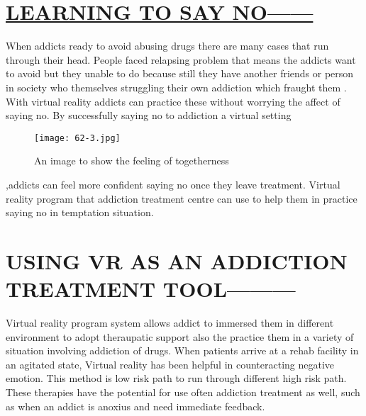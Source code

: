 \documentclass[12pts]{article}
\begin{document}
\section*{\underline{LEARNING TO SAY NO------}}
\begin{large}
\begin{flushleft}
When addicts ready to avoid abusing drugs there are many cases that run 
through their head. People faced relapsing problem that means the addicts 
want to avoid but they unable to do because still they have another friends or 
person in society who themselves struggling their own addiction which fraught 
them . With virtual reality addicts can practice these without worrying the 
affect of saying no. By successfully saying no to addiction a virtual setting 

\begin{figure}[h]
\centering
\texttt{[image: 62-3.jpg]}
\caption{An image to show the feeling of togetherness}
\end{figure}

,addicts can feel more confident saying no once they leave treatment. Virtual 
reality program that addiction treatment centre can use to help them in 
practice saying no in temptation situation.
\end{flushleft}
\end{large}


\section*{USING VR AS AN ADDICTION TREATMENT 
TOOL---------}
\begin{large}
\begin{flushleft}
Virtual reality program system allows addict to immersed them 
in different environment to adopt theraupatic support also the practice them 
in a variety of situation involving addiction of drugs. When patients arrive at a 
rehab facility in an agitated state, Virtual reality has been helpful in 
counteracting negative emotion. This method is low risk path to run through 
different high risk path.
 These therapies have the potential for use often addiction 
treatment as well, such as when an addict is anoxius and need immediate 
feedback.

\end{flushleft}
\end{large}
\end{document}
